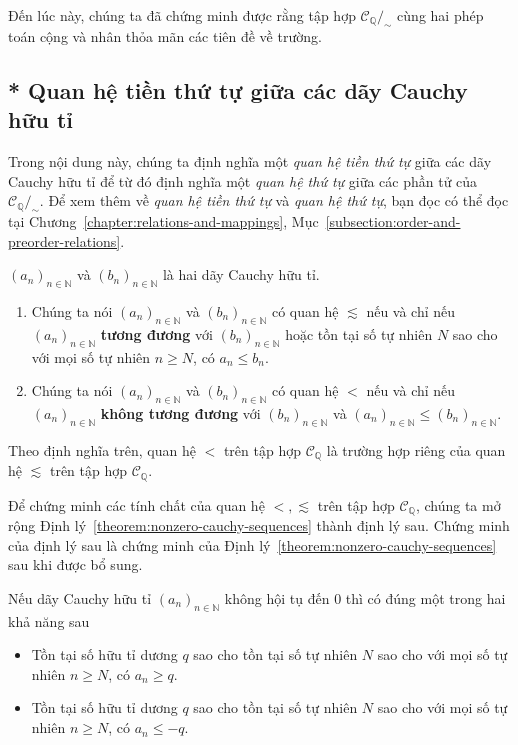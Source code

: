 Đến lúc này, chúng ta đã chứng minh được rằng tập hợp $\mathscr{C}_{\mathbb{Q}}/_{\sim}$ cùng hai phép toán cộng và nhân thỏa mãn các tiên đề về trường.

\subsection{* Quan hệ tiền thứ tự giữa các dãy Cauchy hữu tỉ}

Trong nội dung này, chúng ta định nghĩa một \textit{quan hệ tiền thứ tự} giữa các dãy Cauchy hữu tỉ để từ đó định nghĩa một \textit{quan hệ thứ tự} giữa các phần tử của $\mathscr{C}_{\mathbb{Q}}/_{\sim}$. Để xem thêm về \textit{quan hệ tiền thứ tự} và \textit{quan hệ thứ tự}, bạn đọc có thể đọc tại Chương~\ref{chapter:relations-and-mappings}, Mục~\ref{subsection:order-and-preorder-relations}.

\begin{definition}
    ${(a_{n})}_{n\in\mathbb{N}}$ và ${(b_{n})}_{n\in\mathbb{N}}$ là hai dãy Cauchy hữu tỉ.
    \begin{enumerate}[label={(\roman*)}]
        \item Chúng ta nói ${(a_{n})}_{n\in\mathbb{N}}$ và ${(b_{n})}_{n\in\mathbb{N}}$ có quan hệ $\lesssim$ nếu và chỉ nếu ${(a_{n})}_{n\in\mathbb{N}}$ \textbf{tương đương} với ${(b_{n})}_{n\in\mathbb{N}}$ hoặc tồn tại số tự nhiên $N$ sao cho với mọi số tự nhiên $n\geq N$, có $a_{n}\leq b_{n}$.
        \item Chúng ta nói ${(a_{n})}_{n\in\mathbb{N}}$ và ${(b_{n})}_{n\in\mathbb{N}}$ có quan hệ $<$ nếu và chỉ nếu ${(a_{n})}_{n\in\mathbb{N}}$ \textbf{không tương đương} với ${(b_{n})}_{n\in\mathbb{N}}$ và ${(a_{n})}_{n\in\mathbb{N}}\leq {(b_{n})}_{n\in\mathbb{N}}$.
    \end{enumerate}
\end{definition}

Theo định nghĩa trên, quan hệ $<$ trên tập hợp $\mathscr{C}_{\mathbb{Q}}$ là trường hợp riêng của quan hệ $\lesssim$ trên tập hợp $\mathscr{C}_{\mathbb{Q}}$.

Để chứng minh các tính chất của quan hệ $<, \lesssim$ trên tập hợp $\mathscr{C}_{\mathbb{Q}}$, chúng ta mở rộng Định lý~\ref{theorem:nonzero-cauchy-sequences} thành định lý sau. Chứng minh của định lý sau là chứng minh của Định lý~\ref{theorem:nonzero-cauchy-sequences} sau khi được bổ sung.
\begin{theorem}\label{theorem:nonzero-cauchy-sequences-and-preorder}
    Nếu dãy Cauchy hữu tỉ ${(a_{n})}_{n\in\mathbb{N}}$ không hội tụ đến $0$ thì có đúng một trong hai khả năng sau
    \begin{itemize}
        \item Tồn tại số hữu tỉ dương $q$ sao cho tồn tại số tự nhiên $N$ sao cho với mọi số tự nhiên $n\geq N$, có $a_{n}\geq q$.
        \item Tồn tại số hữu tỉ dương $q$ sao cho tồn tại số tự nhiên $N$ sao cho với mọi số tự nhiên $n\geq N$, có $a_{n}\leq -q$.
    \end{itemize}
\end{theorem}

